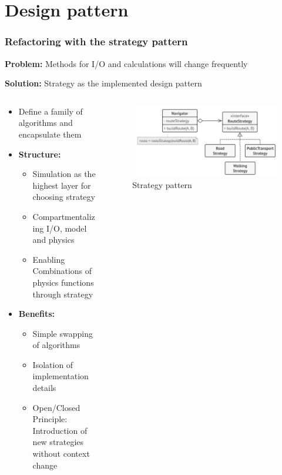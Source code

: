 \section{Design pattern}

\begin{frame}
    \frametitle{Refactoring with the strategy pattern}
    \textbf{Problem:} Methods for I/O and calculations will change frequently

    \textbf{Solution:} Strategy as the implemented design pattern

    \begin{columns}
        \hspace{-25pt}
        \begin{column}{0.55\textwidth}
            \begin{itemize}
                \item Define a family of algorithms and encapsulate them
                \item \textbf{Structure: } 
                \begin{itemize}
                    \item Simulation as the highest layer for choosing strategy
                    \item Compartmentalizing I/O, model and physics
                    \item Enabling Combinations of physics functions through strategy
                \end{itemize}
                \item \textbf{Benefits: }
                \begin{itemize}
                    \item Simple swapping of algorithms
                    \item Isolation of implementation details
                    \item Open/Closed Principle: Introduction of new strategies without context change
                \end{itemize}
            \end{itemize}
        \end{column}
        \begin{column}{0.45\textwidth}
            \begin{figure}
                \includegraphics[width=\columnwidth]{../images/strategy.png}
                \caption{Strategy pattern \cite{StraPattern}}
            \end{figure}
        \end{column}
    \end{columns}

    
\end{frame}